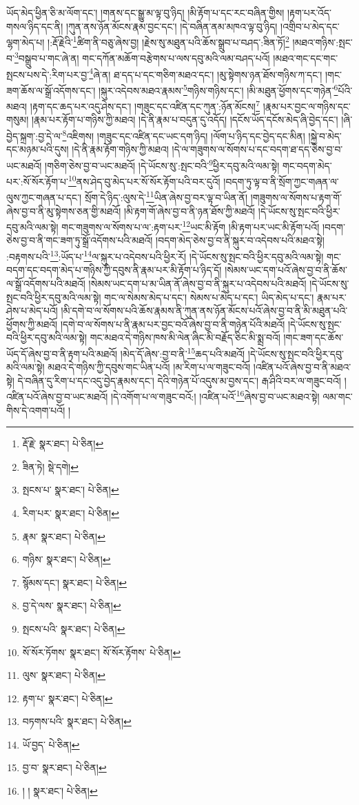 ཡོད་མེད་ཕྱིན་ཅི་མ་ལོག་དང་། །གནས་དང་སྒྱུ་མ་ལྟ་བུ་ཉིད། །མི་རྟོག་པ་དང་རང་བཞིན་གྱིས། །རྟག་པར་འོད་གསལ་ཉིད་དང་ནི། །ཀུན་ནས་ཉོན་མོངས་རྣམ་བྱང་དང་། །དེ་བཞིན་ནམ་མཁའ་ལྟ་བུ་ཉིད། །འགྲིབ་པ་མེད་དང་ལྷག་མེད་པ། །:རྡོ་རྗེའི་\footnote{རྡོ་རྗེ་  སྣར་ཐང་།  པེ་ཅིན། }ཚིག་ནི་བཅུ་ཞེས་བྱ། །རྗེས་སུ་མཐུན་པའི་ཆོས་སྒྲུབ་པ་བཤད་:ཟིན་ཏོ།\footnote{ཟིན་ཏེ།  སྡེ་དགེ། } །མཐའ་གཉིས་:སྤང་བ་\footnote{སྤངས་པ་  སྣར་ཐང་།  པེ་ཅིན། }བསྒྲུབ་པ་གང་ཞེ་ན། གང་དཀོན་མཆོག་བརྩེགས་པ་ལས་དབུ་མའི་ལམ་བཤད་པའོ། །མཐའ་གང་དང་གང་སྤངས་པས་དེ་:རིག་པར་བྱ་\footnote{རིག་པར་  སྣར་ཐང་།  པེ་ཅིན། }ཞེ་ན། ཐ་དད་པ་དང་གཅིག་མཐའ་དང་། །མུ་སྟེགས་ཉན་ཐོས་གཉིས་ཀ་དང་། །གང་ཟག་ཆོས་ལ་སྒྲོ་འདོགས་དང་། །སྐུར་འདེབས་མཐའ་རྣམས་\footnote{རྣམ་  སྣར་ཐང་།  པེ་ཅིན། }གཉིས་གཉིས་དང་། །མི་མཐུན་ཕྱོགས་དང་གཉེན་\footnote{གཉིས་  སྣར་ཐང་།  པེ་ཅིན། }པོའི་མཐའ། །རྟག་དང་ཆད་པར་འདུ་ཤེས་དང་། །གཟུང་དང་འཛིན་དང་ཀུན་:ཉོན་མོངས།\footnote{སྙོམས་དང་།  སྣར་ཐང་།  པེ་ཅིན། } །རྣམ་པར་བྱང་ལ་གཉིས་དང་གསུམ། །རྣམ་པར་རྟོག་པ་གཉིས་ཀྱི་མཐའ། །དེ་ནི་རྣམ་པ་བདུན་དུ་འདོད། །དངོས་ཡོད་དངོས་མེད་ཞི་བྱེད་དང་། །ཞི་བྱེད་སྐྲག་:བྱ་དེ་ལ་\footnote{བྱ་དེ་ལས་  སྣར་ཐང་།  པེ་ཅིན། }འཇིགས། །གཟུང་དང་འཛིན་དང་ཡང་དག་ཉིད། །ལོག་པ་ཉིད་དང་བྱེད་དང་མིན། །སྐྱེ་བ་མེད་དང་མཉམ་པའི་དུས། །དེ་ནི་རྣམ་རྟོག་གཉིས་ཀྱི་མཐའ། །དེ་ལ་གཟུགས་ལ་སོགས་པ་དང་བདག་ཐ་དད་ཅེས་བྱ་བ་ཡང་མཐའོ། །གཅིག་ཅེས་བྱ་བ་ཡང་མཐའོ། །དེ་ཡོངས་སུ་:སྤང་བའི་\footnote{སྤངས་པའི་  སྣར་ཐང་།  པེ་ཅིན། }ཕྱིར་དབུ་མའི་ལམ་སྟེ། གང་བདག་མེད་པར་:སོ་སོར་རྟོག་པ་\footnote{སོ་སོར་ཏོགས་  སྣར་ཐང་། སོ་སོར་རྟོགས་  པེ་ཅིན། }ནས་ཤེད་བུ་མེད་པར་སོ་སོར་རྟོག་པའི་བར་དུའོ། །བདག་ཏུ་ལྟ་བ་ནི་སྲོག་ཀྱང་གཞན་ལ་ལུས་ཀྱང་གཞན་པ་དང་། སྲོག་དེ་ཉིད་:ལུས་དེ་\footnote{ལུས་  སྣར་ཐང་།  པེ་ཅིན། }ཡིན་ཞེས་བྱ་བར་ལྟ་བ་ཡིན་ནོ། །གཟུགས་ལ་སོགས་པ་རྟག་གོ་ཞེས་བྱ་བ་ནི་མུ་སྟེགས་ཅན་གྱི་མཐའོ། །མི་རྟག་གོ་ཞེས་བྱ་བ་ནི་ཉན་ཐོས་ཀྱི་མཐའོ། །དེ་ཡོངས་སུ་སྤང་བའི་ཕྱིར་དབུ་མའི་ལམ་སྟེ། གང་གཟུགས་ལ་སོགས་པ་ལ་:རྟག་པར་\footnote{རྟག་པ་  སྣར་ཐང་།  པེ་ཅིན། }ཡང་མི་རྟོག །མི་རྟག་པར་ཡང་མི་རྟོག་པའོ། །བདག་ཅེས་བྱ་བ་ནི་གང་ཟག་ཏུ་སྒྲོ་འདོགས་པའི་མཐའོ། །བདག་མེད་ཅེས་བྱ་བ་ནི་སྐུར་བ་འདེབས་པའི་མཐའ་སྟེ། :བརྟགས་པའི་\footnote{བཏགས་པའི་  སྣར་ཐང་།  པེ་ཅིན། }:ཡོད་པ་\footnote{ཡོ་བྱད་  པེ་ཅིན། }ལ་སྐུར་པ་འདེབས་པའི་ཕྱིར་རོ། །དེ་ཡོངས་སུ་སྤང་བའི་ཕྱིར་དབུ་མའི་ལམ་སྟེ། གང་བདག་དང་བདག་མེད་པ་གཉིས་ཀྱི་དབུས་ནི་རྣམ་པར་མི་རྟོག་པ་ཉིད་དོ། །སེམས་ཡང་དག་པའོ་ཞེས་བྱ་བ་ནི་ཆོས་ལ་སྒྲོ་འདོགས་པའི་མཐའོ། །སེམས་ཡང་དག་པ་མ་ཡིན་ནོ་ཞེས་བྱ་བ་ནི་སྐུར་པ་འདེབས་པའི་མཐའོ། །དེ་ཡོངས་སུ་སྤང་བའི་ཕྱིར་དབུ་མའི་ལམ་སྟེ། གང་ལ་སེམས་མེད་པ་དང་། སེམས་པ་མེད་པ་དང་། ཡིད་མེད་པ་དང་། རྣམ་པར་ཤེས་པ་མེད་པའོ། །མི་དགེ་བ་ལ་སོགས་པའི་ཆོས་རྣམས་ནི་ཀུན་ནས་ཉོན་མོངས་པའོ་ཞེས་བྱ་བ་ནི་མི་མཐུན་པའི་ཕྱོགས་ཀྱི་མཐའོ། །དགེ་བ་ལ་སོགས་པ་ནི་རྣམ་པར་བྱང་བའོ་ཞེས་བྱ་བ་ནི་གཉེན་པོའི་མཐའོ། །དེ་ཡོངས་སུ་སྤང་བའི་ཕྱིར་དབུ་མའི་ལམ་སྟེ། གང་མཐའ་དེ་གཉིས་ཁས་མི་ལེན་ཞིང་མི་བརྗོད་ཅིང་མི་སྨྲ་བའོ། །གང་ཟག་དང་ཆོས་ཡོད་དོ་ཞེས་བྱ་བ་ནི་རྟག་པའི་མཐའོ། །མེད་དོ་ཞེས་:བྱ་བ་ནི་\footnote{བྱ་བ་  སྣར་ཐང་།  པེ་ཅིན། }ཆད་པའི་མཐའོ། །དེ་ཡོངས་སུ་སྤང་བའི་ཕྱིར་དབུ་མའི་ལམ་སྟེ། མཐའ་དེ་གཉིས་ཀྱི་དབུས་གང་ཡིན་པའོ། །མ་རིག་པ་ལ་གཟུང་བའོ། །འཛིན་པའོ་ཞེས་བྱ་བ་ནི་མཐའ་སྟེ། དེ་བཞིན་དུ་རིག་པ་དང་འདུ་བྱེད་རྣམས་དང་། དེའི་གཉེན་པོ་འདུས་མ་བྱས་དང་། རྒ་ཤིའི་བར་ལ་གཟུང་བའོ། །འཛིན་པའོ་ཞེས་བྱ་བ་ཡང་མཐའོ། །དེ་འགོག་པ་ལ་གཟུང་བའོ:། །འཛིན་པའོ་\footnote{། །  སྣར་ཐང་།  པེ་ཅིན། }ཞེས་བྱ་བ་ཡང་མཐའ་སྟེ། ལམ་གང་གིས་དེ་འགག་པའོ། །
